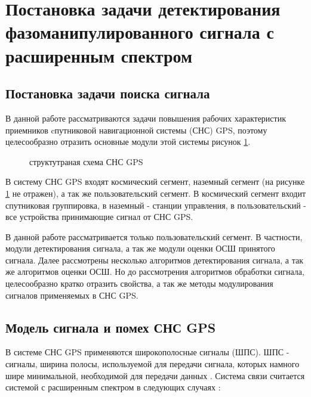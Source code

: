\section{Постановка задачи детектирования фазоманипулированного сигнала с расширенным спектром}
\label{sec1_acq_algo}

\subsection{Постановка задачи поиска сигнала}
В данной работе рассматриваются задачи повышения рабочих характеристик приемников cпутниковой навигационной системы
(СНС) GPS, поэтому целесообразно
отразить основные модули этой системы рисунок \ref{pic:sec1_gnss_system}.
\begin{figure}[H]
\center{}
\caption{структутраная схема СНС GPS}
\label{pic:sec1_gnss_system}
\end{figure}

В систему СНС GPS входят космический сегмент, наземный сегмент (на рисунке \ref{pic:sec1_gnss_system} не
отражен), а так же пользовательский сегмент. В космический сегмент входит спутниковая группировка, в 
наземный - станции управления, в пользовательский - все устройства принимающие сигнал от СНС GPS.

В данной работе рассматривается только пользовательский сегмент. В частности, модули детектирования сигнала,
а так же модули оценки ОСШ принятого сигнала. Далее рассмотрены несколько алгоритмов детектирования сигнала,
а так же алгоритмов оценки ОСШ. Но до рассмотрения алгоритмов обработки сигнала, целесообразно кратко 
отразить свойства, а так же методы модулирования сигналов применяемых в СНС GPS.

\subsection{Модель сигнала и помех СНС GPS}
В системе СНС GPS применяются широкополосные сигналы (ШПС).
ШПС - сигналы, ширина полосы, используемой для передачи сигнала, которых
намного шире минимальной, необходимой для передачи данных \cite{sklyar}. Система связи считается системой с расширенным
спектром в следующих случаях \cite{sklyar}:

